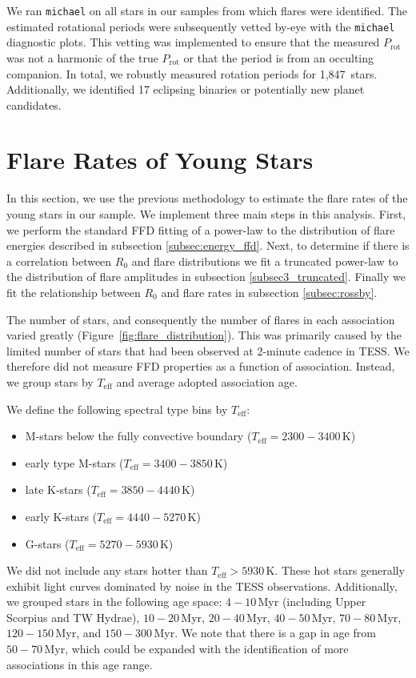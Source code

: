 \documentclass[twocolumn]{aastex631}
\newcommand{\nprot}{1,847}
\begin{document}
We ran \texttt{michael} on all stars in our samples from which flares were identified. The estimated rotational periods were subsequently vetted by-eye  with the \texttt{michael} diagnostic plots. This vetting was implemented to ensure that the measured $P_\textrm{rot}$ was not a harmonic of the true $P_\textrm{rot}$ or that the period is from an occulting companion. In
total, we robustly measured rotation periods for \nprot\ stars. Additionally, we identified 17 eclipsing binaries or potentially new planet candidates.

\section{Flare Rates of Young Stars}\label{sec:results}

In this section, we use the previous methodology to estimate the flare rates of the young stars in our sample. We implement three main steps in this analysis. First, we perform the standard FFD fitting of a power-law to the distribution of flare energies described in subsection \ref{subsec:energy_ffd}. Next, to determine if there is a correlation between $R_0$ and flare distributions we fit a truncated power-law to the distribution of flare amplitudes in subsection \ref{subsec3_truncated}. Finally we fit the relationship between $R_0$ and flare rates in subsection \ref{subsec:rossby}.

The number of stars, and consequently the number of flares in  each association varied greatly (Figure~\ref{fig:flare_distribution}). This was primarily caused by the limited number of stars that had been observed at 2-minute cadence in TESS.  We therefore did not measure FFD properties as a function of association. Instead, we group stars by $T_\textrm{eff}$ and average adopted association age.

We define the following spectral type bins by $T_\textrm{eff}$:
 \begin{itemize}
     \item M-stars below the fully convective boundary ($T_\textrm{eff} = 2300 - 3400$\,K)
     \item  early type M-stars ($T_\textrm{eff} = 3400 - 3850$\,K)
     \item  late K-stars ($T_\textrm{eff} = 3850 - 4440$\,K)
     \item early K-stars ($T_\textrm{eff} = 4440 - 5270$\,K)
     \item G-stars ($T_\textrm{eff} = 5270 - 5930$\,K)
 \end{itemize}
We did not include any stars hotter than $T_\textrm{eff} > 5930$\,K.  These hot stars generally exhibit light curves  dominated by noise in the TESS observations. Additionally, we grouped stars in the following age space: $4-10$\,Myr (including Upper Scorpius and TW Hydrae), $10-20$\,Myr, $20-40$\,Myr, $40-50$\,Myr, $70-80$\,Myr, $120-150$\,Myr, and $150-300$\,Myr. We note that there is a gap in age from $50-70$\,Myr, which could be expanded with the identification of more associations in this age range.
\end{document}
